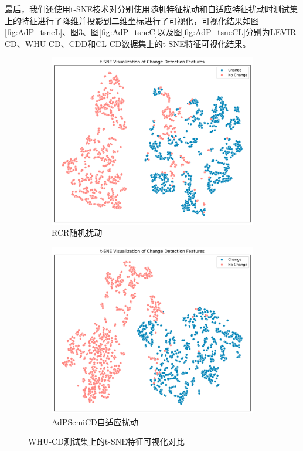 \documentclass[lang=chs, degree=master, blindreview=false, adobe=false]{yanputhesis}
\begin{document}
最后，我们还使用t-SNE技术对分别使用随机特征扰动和自适应特征扰动时测试集上的特征进行了降维并投影到二维坐标进行了可视化，可视化结果如图\ref{fig:AdP_tsneL}、图\ref{fig:AdP_tsneW}、图\ref{fig:AdP_tsneC}以及图\ref{fig:AdP_tsneCL}分别为LEVIR-CD、WHU-CD、CDD和CL-CD数据集上的t-SNE特征可视化结果。
\begin{figure}[H]
  \centering
  \hspace*{\fill} %
  \begin{subfigure}[t]{0.46\textwidth} %
      \centering
      \includegraphics[scale=0.36]{images/tsne_5RCRw.png}
      \caption{RCR随机扰动}
      \label{fig:tsneW_left}
  \end{subfigure}
  \hfill %
  \begin{subfigure}[t]{0.46\textwidth} %
      \centering
      \includegraphics[scale=0.36]{images/tsne_5AdPw.png} %
      \caption{AdPSemiCD自适应扰动} %
      \label{fig:tsneW_right}
  \end{subfigure}
  \hspace*{\fill} %
  \caption{WHU-CD测试集上的t-SNE特征可视化对比}
  \label{fig:AdP_tsneW}
\end{figure}
\end{document}
